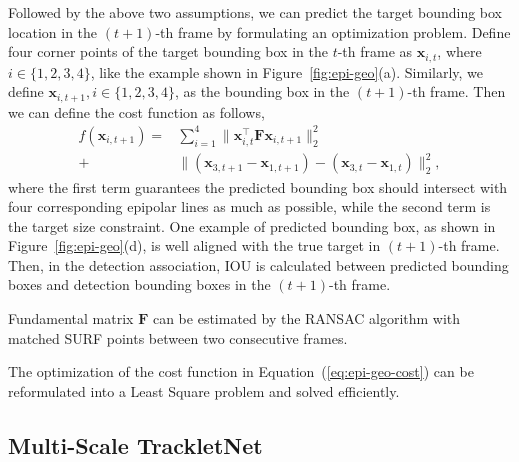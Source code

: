 \documentclass[10pt,twocolumn,letterpaper]{article}
\begin{document}
Followed by the above two assumptions, we can predict the target bounding box location in the $(t+1)$-th frame by formulating an optimization problem. 
Define four corner points of the target bounding box in the $t$-th frame as $\mathbf{x}_{i,t}$, where $i\in\{1,2,3,4\}$, like the example shown in Figure~\ref{fig:epi-geo}(a). 
Similarly, we define $\mathbf{x}_{i,t+1}, i \in \{1,2,3,4\}$, as the bounding box in the $(t+1)$-th frame. 
Then we can define the cost function as follows,
\begin{equation}
\label{eq:epi-geo-cost}
\begin{aligned}
    f(\mathbf{x}_{i,t+1}) = &\sum_{i=1}^4 \lVert \mathbf{x}_{i,t}^\top \mathbf{F} \mathbf{x}_{i,t+1} \rVert_2^2 \\
    + &\lVert (\mathbf{x}_{3, t+1} - \mathbf{x}_{1,t+1}) - (\mathbf{x}_{3,t} - \mathbf{x}_{1,t} ) \rVert_2^2,
\end{aligned}
\end{equation}
where the first term guarantees the predicted bounding box should intersect with four corresponding epipolar lines as much as possible, while the second term is the target size constraint. One example of predicted bounding box, as shown in Figure~\ref{fig:epi-geo}(d), is well aligned with the true target in $(t+1)$-th frame. Then, in the detection association, IOU is calculated between predicted bounding boxes 
and detection bounding boxes in the $(t+1)$-th frame.



Fundamental matrix $\mathbf{F}$ can be estimated by the RANSAC \cite{fischler1981random} algorithm with matched SURF points \cite{bay2006surf} between two consecutive frames. 


The optimization of the cost function in Equation~(\ref{eq:epi-geo-cost}) can be reformulated into a Least Square problem and solved efficiently.





\subsection{Multi-Scale TrackletNet}
\label{sec:trackletnet}
\end{document}
